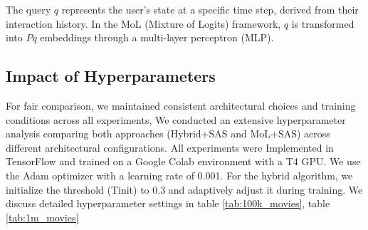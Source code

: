 \documentclass[Afour,sageh,times]{sagej}
\begin{document}
The query \( q \) represents the user's state at a specific time step, derived from their interaction history. In the MoL (Mixture of Logits) framework, \( q \) is transformed into \( Pq \)
embeddings through a multi-layer perceptron (MLP).
\subsection{Impact of Hyperparameters}
For fair comparison, we maintained consistent architectural choices and training conditions across all experiments, We conducted an extensive hyperparameter analysis comparing both approaches (Hybrid+SAS and MoL+SAS) across different architectural configurations. All experiments were Implemented in TensorFlow and trained on a Google Colab environment with a T4 GPU. We use the Adam optimizer with a learning rate of 0.001. For the hybrid algorithm, we initialize the threshold (Tinit) to 0.3 and adaptively adjust it during training. We discuss detailed hyperparameter settings in table \ref{tab:100k_movies}, table \ref{tab:1m_movies}

%
\end{document}
